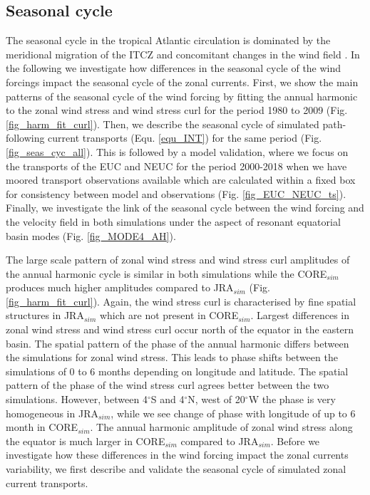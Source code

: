 \documentclass[os, manuscript]{copernicus}
\begin{document}
\subsection{Seasonal cycle}
The seasonal cycle in the tropical Atlantic circulation is dominated by the meridional migration of the ITCZ and concomitant changes in the wind field \citep[e.g.,][]{Xie2004}. In the following we investigate how differences in the seasonal cycle of the wind forcings impact the seasonal cycle of the zonal currents. First, we show the main patterns of the seasonal cycle of the wind forcing by fitting the annual harmonic to the zonal wind stress and wind stress curl for the period 1980 to 2009 (Fig. \ref{fig_harm_fit_curl}). Then, we describe the seasonal cycle of simulated path-following current transports (Equ. \ref{equ_INT}) for the same period (Fig. \ref{fig_seas_cyc_all}). This is followed by a model validation, where we focus on the transports of the EUC and NEUC for the period 2000-2018 when we have moored transport observations available which are calculated within a fixed box for consistency between model and observations (Fig. \ref{fig_EUC_NEUC_ts}). Finally, we investigate the link of the seasonal cycle between the wind forcing and the velocity field in both simulations under the aspect of resonant equatorial basin modes (Fig. \ref{fig_MODE4_AH}).

The large scale pattern of zonal wind stress and wind stress curl amplitudes of the annual harmonic cycle is similar in both simulations while the CORE$_{sim}$ produces much higher amplitudes compared to JRA$_{sim}$ (Fig. \ref{fig_harm_fit_curl}). Again, the wind stress curl is characterised by fine spatial structures in JRA$_{sim}$ which are not present in CORE$_{sim}$. Largest differences in zonal wind stress and wind stress curl occur north of the equator in the eastern basin. The spatial pattern of the phase of the annual harmonic differs between the simulations  for zonal wind stress. This leads to phase shifts between the simulations of 0 to 6 months depending on longitude and latitude. The spatial pattern of the phase of the wind stress curl agrees better between the two simulations. However, between 4$^{\circ}$S and 4$^{\circ}$N, west of 20$^{\circ}$W the phase is very homogeneous in JRA$_{sim}$, while we see change of phase with longitude of up to 6 month in CORE$_{sim}$. The annual harmonic amplitude of zonal wind stress along the equator is much larger in CORE$_{sim}$ compared to JRA$_{sim}$. Before we investigate how these differences in the wind forcing impact the zonal currents variability, we  first describe and validate the seasonal cycle of simulated zonal current transports.
\end{document}
